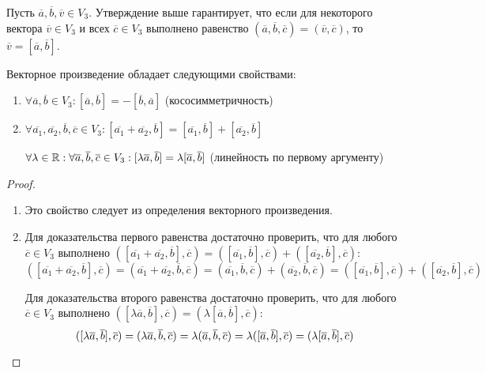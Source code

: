 \begin{note}
	Пусть $\overline a, \overline b, \overline{v} \in V_3$. Утверждение выше гарантирует, что если для некоторого вектора $\overline{v} \in V_3$ и всех $\overline{c} \in V_3$ выполнено равенство $(\overline{a}, \overline{b}, \overline{c}) = (\overline{v}, \overline{c})$, то $ \overline{v} = [\overline{a}, \overline{b}]$.
\end{note}

\begin{theorem}
	Векторное произведение обладает следующими свойствами:
	\begin{enumerate}
		\item $\forall \overline a, \overline b \in V_3: [\overline{a}, \overline{b}] = -[\overline{b}, \overline{a}]$ (кососимметричность)
		\item $\forall \overline{a_1}, \overline{a_2}, \overline{b}, \overline{c} \in V_3: [\overline{a_1} + \overline{a_2}, \overline{b}] = [\overline{a_1}, \overline{b}] + [\overline{a_2}, \overline{b}]$
		
		$\forall \lambda \in \mathbb{R}: \forall \overline{a}, \overline{b}, \overline{c} \in V_3: [\lambda\overline{a}, \overline{b}] = \lambda[\overline{a}, \overline{b}]$ (линейность по первому аргументу)
	\end{enumerate}
\end{theorem}

\begin{proof}~
	\begin{enumerate}
		\item Это свойство следует из определения векторного произведения.
		\item Для доказательства первого равенства достаточно проверить, что для любого $\overline{c} \in V_3$ выполнено $([\overline{a_1} + \overline{a_2}, \overline{b}], \overline{c}) = ([\overline{a_1}, \overline{b}], \overline{c}) + ([\overline{a_2}, \overline{b}], \overline{c})$:
		\[
		([\overline{a_1} + \overline{a_2}, \overline{b}], \overline{c}) = (\overline{a_1} + \overline{a_2}, \overline{b}, \overline{c}) = (\overline{a_1}, \overline{b}, \overline{c}) + (\overline{a_2}, \overline{b}, \overline{c}) = ([\overline{a_1}, \overline{b}], \overline{c}) + ([\overline{a_2}, \overline{b}], \overline{c})
		\]
		
		Для доказательства второго равенства достаточно проверить, что для любого $\overline{c} \in V_3$ выполнено $([\lambda\overline{a}, \overline{b}], \overline{c}) = (\lambda[\overline{a}, \overline{b}], \overline{c})$:
		\[
		([\lambda\overline{a}, \overline{b}], \overline{c}) = (\lambda\overline{a}, \overline{b}, \overline{c}) = \lambda(\overline{a}, \overline{b}, \overline{c}) = \lambda([\overline{a}, \overline{b}], \overline{c}) = (\lambda[\overline{a}, \overline{b}], \overline{c})
		\qedhere
		\]
	\end{enumerate}
\end{proof}

